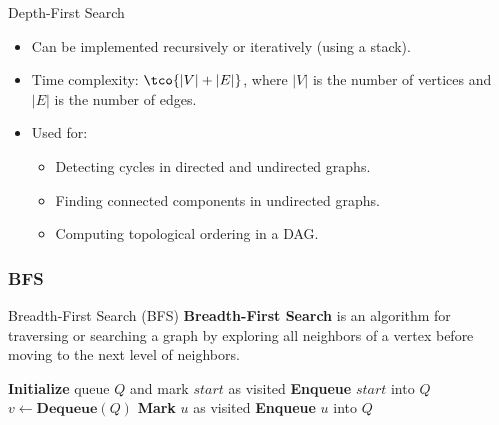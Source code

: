 \begin{properties}[]{Depth-First Search}
    \begin{itemize}
        \item Can be implemented recursively or iteratively (using a stack).
        \item Time complexity: $\tco{|V| + |E|}$, where $|V|$ is the number of vertices and $|E|$ is the number of edges.
        \item Used for:
              \begin{itemize}
                  \item Detecting cycles in directed and undirected graphs.
                  \item Finding connected components in undirected graphs.
                  \item Computing topological ordering in a DAG.
              \end{itemize}
    \end{itemize}
\end{properties}


\subsubsection{BFS}
\begin{definition}[]{Breadth-First Search (BFS)}
    \textbf{Breadth-First Search} is an algorithm for traversing or searching a graph by exploring all neighbors of a vertex before moving to the next level of neighbors.
\end{definition}

\begin{algorithm}
    \caption{Breadth-First Search (Iterative)}
    \begin{algorithmic}[1]
            \State \textbf{Initialize} queue $Q$ and mark $start$ as visited
            \State \textbf{Enqueue} $start$ into $Q$
                \State $v \gets \textbf{Dequeue}(Q)$
                        \State \textbf{Mark} $u$ as visited
                        \State \textbf{Enqueue} $u$ into $Q$
                    \EndIf
                \EndFor
            \EndWhile
        \EndProcedure
    \end{algorithmic}
\end{algorithm}

